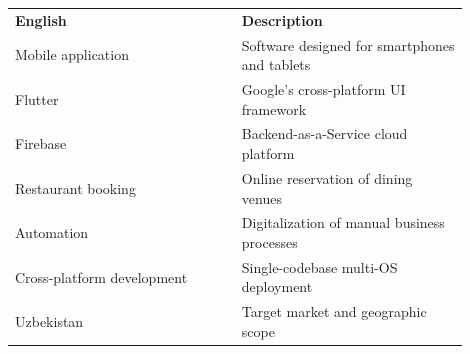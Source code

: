 \frontmatterpage
{}
\begin{tabular}{p{0.45\linewidth}p{0.45\linewidth}}
\textbf{English} & \textbf{Description}\\
Mobile application & Software designed for smartphones and tablets\\
Flutter & Google's cross-platform UI framework\\
Firebase & Backend-as-a-Service cloud platform\\
Restaurant booking & Online reservation of dining venues\\
Automation & Digitalization of manual business processes\\
Cross-platform development & Single-codebase multi-OS deployment\\
Uzbekistan & Target market and geographic scope\\
\end{tabular}
\clearpage

